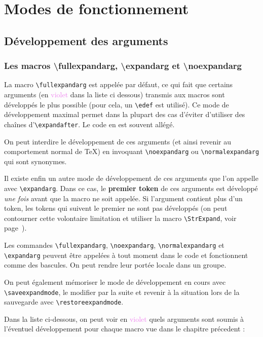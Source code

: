 \documentclass[a4paper,10pt]{article}
\newcommand\verbinline{\lstinline[basicstyle=\normalsize\ttfamily]}
\begin{document}
\section{Modes de fonctionnement}
\subsection{Développement des arguments}
\label{devarg}
\lstset{basicstyle=\footnotesize\ttfamily}
\subsubsection{Les macros {\ttfamily \textbackslash fullexpandarg}, {\ttfamily \textbackslash expandarg} et {\ttfamily \textbackslash noexpandarg}}
La macro \verbinline|\fullexpandarg| est appelée par défaut, ce qui fait que certains arguments (en \textcolor{violet}{violet} dans la liste ci dessous) transmis aux macros sont développés le plus possible (pour cela, un \verb|\edef| est utilisé). Ce mode de développement maximal permet dans la plupart des cas d'éviter d'utiliser des chaînes d'\verb|\expandafter|. Le code en est souvent allégé.

On peut interdire le développement de ces arguments (et ainsi revenir au comportement normal de \TeX) en invoquant \verbinline|\noexpandarg| ou \verbinline|\normalexpandarg| qui sont synonymes.\medskip

Il existe enfin un autre mode de développement de ces arguments que l'on appelle avec \verbinline|\expandarg|. Dans ce cas, le \textbf{premier token} de ces arguments est développé \emph{une fois} avant que la macro ne soit appelée. Si l'argument contient plus d'un token, les tokens qui suivent le premier ne sont pas développés (on peut contourner cette volontaire limitation et utiliser la macro \verbinline|\StrExpand|, voir page~\pageref{scancs}).\medskip

Les commandes \verbinline|\fullexpandarg|, \verbinline|\noexpandarg|, \verbinline|\normalexpandarg| et \verbinline|\expandarg| peuvent être appelées à tout moment dans le code et fonctionnent comme des bascules. On peut rendre leur portée locale dans un groupe.\medskip

On peut également mémoriser le mode de développement en cours avec \verbinline|\saveexpandmode|, le modifier par la suite et revenir à la situation lors de la sauvegarde avec \verbinline|\restoreexpandmode|.\medskip

Dans la liste ci-dessous, on peut voir en \textcolor{violet}{violet} quels arguments sont soumis à l'éventuel développement pour chaque macro vue dans le chapitre précedent :
\end{document}
